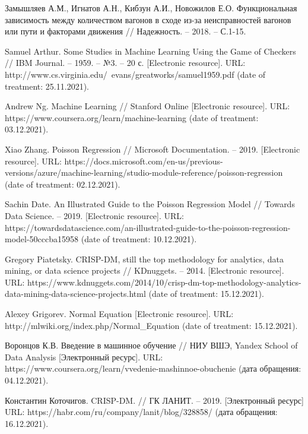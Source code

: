 \begin{thebibliography}{00}
    
     Замышляев А.М., Игнатов А.Н., Кибзун А.И., Новожилов Е.О. Функциональная зависимость между количеством вагонов в сходе из-за неисправностей вагонов или пути и факторами движения // Надежность. -- 2018. -- С.1-15.
    
     Samuel Arthur. Some Studies in Machine Learning Using the Game of Checkers // IBM Journal. -- 1959. -- №3. -- 20 с. [Electronic resource]. URL: http://www.cs.virginia.edu/~evans/greatworks/samuel1959.pdf (date of treatment: 25.11.2021).
    
     Andrew Ng. Machine Learning // Stanford Online [Electronic resource]. URL: https://www.coursera.org/learn/machine-learning (date of treatment: 03.12.2021).
    
     Xiao Zhang. Poisson Regression // Microsoft Documentation. -- 2019. [Electronic resource]. URL: https://docs.microsoft.com/en-us/previous-versions/azure/machine-learning/studio-module-reference/poisson-regression (date of treatment: 02.12.2021).
    
     Sachin Date. An Illustrated Guide to the Poisson Regression Model // Towards Data Science. -- 2019. [Electronic resource]. URL: https://towardsdatascience.com/an-illustrated-guide-to-the-poisson-regression-model-50cccba15958 (date of treatment: 10.12.2021).
    
     Gregory Piatetsky. CRISP-DM, still the top methodology for analytics, data mining, or data science projects // KDnuggets. -- 2014. [Electronic resource]. URL: https://www.kdnuggets.com/2014/10/crisp-dm-top-methodology-analytics-data-mining-data-science-projects.html (date of treatment: 15.12.2021).
    
     Alexey Grigorev. Normal Equation [Electronic resource]. URL: http://mlwiki.org/index.php/Normal\_Equation (date of treatment: 15.12.2021).
    
     Воронцов К.В. Введение в машинное обучение // НИУ ВШЭ, Yandex School of Data Analysis [Электронный ресурс]. URL: https://www.coursera.org/learn/vvedenie-mashinnoe-obuchenie (дата обращения: 04.12.2021).
    
     Константин Коточигов. CRISP-DM. // ГК ЛАНИТ. -- 2019. [Электронный ресурс] URL: https://habr.com/ru/company/lanit/blog/328858/ (дата обращения: 16.12.2021).
    

\end{thebibliography}
